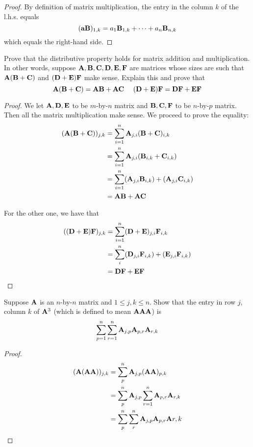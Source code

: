 \documentclass{extarticle}
\begin{document}
\begin{proof}
By definition of matrix multiplication, the entry in the column \(k\) of the l.h.s. equals 
\[(\mathbf{a} \mathbf{B})_{1, k} = a_1 \mathbf{B}_{1, k} + \cdots + a_n \mathbf{B}_{n, k}\]
which equals the right-hand side. 
\end{proof}

\begin{problem}{11}
    Prove that the distributive property holds for matrix addition and multiplication. In 
    other words, suppose \(\mathbf{A}, \mathbf{B}, \mathbf{C}, \mathbf{D}, \mathbf{E}, \mathbf{F}\) are matrices whose sizes are such that 
    \(\mathbf{A}(\mathbf{B} + \mathbf{C})\) and \((\mathbf{D} + \mathbf{E})\mathbf{F}\) make sense. Explain this and prove that 
    \[\mathbf{A}(\mathbf{B} + \mathbf{C}) = \mathbf{A} \mathbf{B} + \mathbf{A} \mathbf{C} \ \ \ \ (\mathbf{D} + \mathbf{E})\mathbf{F} = \mathbf{D} \mathbf{F} + \mathbf{E} \mathbf{F}\]
\end{problem}

\begin{proof}
We let \(\mathbf{A}, \mathbf{D}, \mathbf{E}\) to be \(m\)-by-\(n\) matrix and \(\mathbf{B}, \mathbf{C}, \mathbf{F}\) to be \(n\)-by-\(p\) matrix. Then 
all the matrix multiplication make sense. We proceed to prove the equality:
\begin{align*}
    (\mathbf{A} (\mathbf{B} + \mathbf{C}))_{j, k} 
    &= \sum_{i=1}^{n} \mathbf{A}_{j, i} (\mathbf{B} + \mathbf{C})_{i, k} \\ 
    &= \sum_{i=1}^{n} \mathbf{A}_{j, i} (\mathbf{B}_{i, k} + \mathbf{C}_{i, k}) \\ 
    &= \sum_{i=1}^{n} (\mathbf{A}_{j, i} \mathbf{B}_{i, k}) + (\mathbf{A}_{j, i} \mathbf{C}_{i, k}) \\ 
    &= \mathbf{A} \mathbf{B} + \mathbf{A} \mathbf{C} 
\end{align*}

For the other one, we have that 
\begin{align*}
    ((\mathbf{D} + \mathbf{E})\mathbf{F})_{j, k} 
    &= \sum_{i=1}^{n} (\mathbf{D} + \mathbf{E})_{j, i} \mathbf{F}_{i, k} \\ 
    &= \sum_i^n (\mathbf{D}_{j, i} \mathbf{F}_{i, k}) + (\mathbf{E}_{j, i} \mathbf{F}_{i, k}) \\ 
    &= \mathbf{D} \mathbf{F} + \mathbf{E} \mathbf{F} 
\end{align*}
\end{proof}

\begin{problem}{13}
    Suppose \(\mathbf{A}\) is an \(n\)-by-\(n\) matrix and \(1 \leq j, k \leq n\). Show that the entry 
    in row \(j\), column \(k\) of \(\mathbf{A}^3\) (which is defined to mean \(\mathbf{A} \mathbf{A} \mathbf{A}\)) is 
    \[\sum_{p=1}^{n} \sum_{r=1}^{n} \mathbf{A}_{j, p} \mathbf{A}_{p, r} \mathbf{A}_{r, k}\]
\end{problem}

\begin{proof}
\begin{align*}
    (\mathbf{A} (\mathbf{A} \mathbf{A}))_{j, k }
    &= \sum_p^n \mathbf{A}_{j, p} (\mathbf{A} \mathbf{A})_{p, k} \\ 
    &= \sum_p^n \mathbf{A}_{j, p} \sum_{r=1}^{n} \mathbf{A}_{p, r} \mathbf{A}_{r, k} \\ 
    &= \sum_{p}^{n} \sum_r^n \mathbf{A}_{j, p} \mathbf{A}_{p, r} \mathbf{A}{r, k}
\end{align*}
\end{proof}
\end{document}
